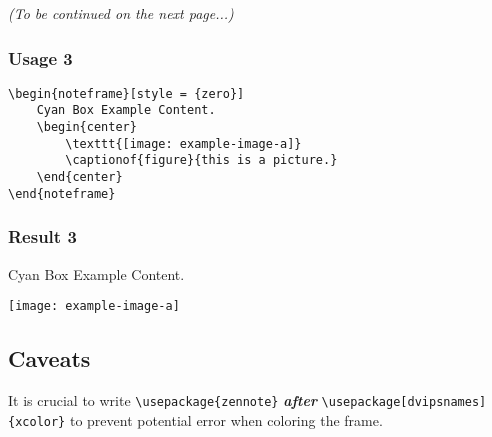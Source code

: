 \documentclass{article}
\begin{document}
\begin{flushright}
{\sl (To be continued on the next page...)}
\end{flushright}

\newpage

\subsubsection{Usage 3}
\begin{flushleft}
\begin{verbatim}
\begin{noteframe}[style = {zero}]
    Cyan Box Example Content.
    \begin{center}
        \texttt{[image: example-image-a]}
        \captionof{figure}{this is a picture.}
    \end{center}
\end{noteframe}
\end{verbatim}
\end{flushleft}

\subsubsection{Result 3}
\begin{noteframe}[style = {zero}]
    Cyan Box Example Content.
    \begin{center}
        \texttt{[image: example-image-a]}
    \end{center}
\end{noteframe}

\subsection{Caveats}
It is crucial to write \verb+\usepackage{zennote}+ \textbf{\textit{after}} \verb+\usepackage[dvipsnames]{xcolor}+ to prevent potential error when coloring the frame.
\end{document}
